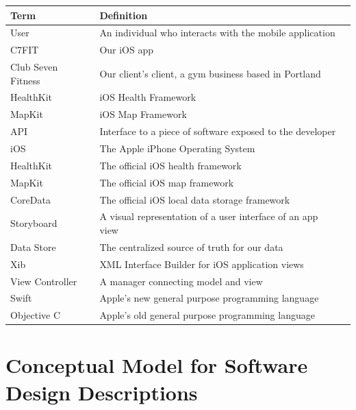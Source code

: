 \documentclass[letterpaper,10pt,titlepage]{article}
\begin{document}
\begin{center}
    \begin{tabular}{ | l | l | p{5cm} |}
    \hline
Term               & Definition                                               \\ \hline
User               & An individual who interacts with the mobile application  \\ \hline
C7FIT              & Our iOS app                                              \\ \hline
Club Seven Fitness & Our client's client, a gym business based in Portland    \\ \hline
HealthKit          & iOS Health Framework                                     \\ \hline
MapKit             & iOS Map Framework                                        \\ \hline
API                & Interface to a piece of software exposed to the developer\\ \hline
iOS                & The Apple iPhone Operating System                        \\ \hline
HealthKit          & The official iOS health framework                        \\ \hline
MapKit             & The official iOS map framework                           \\ \hline
CoreData           & The official iOS local data storage framework            \\ \hline
Storyboard         & A visual representation of a user interface of an app view\\ \hline
Data Store         & The centralized source of truth for our data             \\ \hline
Xib                & XML Interface Builder for iOS application views          \\ \hline
View Controller    & A manager connecting model and view                      \\ \hline
Swift              & Apple's new general purpose programming language         \\ \hline
Objective C        & Apple's old general purpose programming language         \\ \hline

    \end{tabular}
\end{center}

\section{Conceptual Model for Software Design Descriptions}
\end{document}
